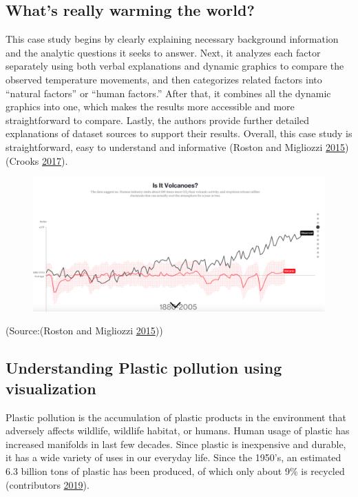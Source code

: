 \documentclass[]{book}
\begin{document}
\subsection{What's really warming the
world?}\label{whats-really-warming-the-world}

This case study begins by clearly explaining necessary background
information and the analytic questions it seeks to answer. Next, it
analyzes each factor separately using both verbal explanations and
dynamic graphics to compare the observed temperature movements, and then
categorizes related factors into ``natural factors'' or ``human
factors.'' After that, it combines all the dynamic graphics into one,
which makes the results more accessible and more straightforward to
compare. Lastly, the authors provide further detailed explanations of
dataset sources to support their results. Overall, this case study is
straightforward, easy to understand and informative (Roston and
Migliozzi \protect\hyperlink{ref-world_warming}{2015}) (Crooks
\protect\hyperlink{ref-int_viz_capt}{2017}).

\begin{figure}
\centering
\includegraphics{images/volcano_global_warming.png}
\caption{}
\end{figure}

(Source:(Roston and Migliozzi
\protect\hyperlink{ref-world_warming}{2015}))

\subsection{Understanding Plastic pollution using
visualization}\label{understanding-plastic-pollution-using-visualization}

Plastic pollution is the accumulation of plastic products in the
environment that adversely affects wildlife, wildlife habitat, or
humans. Human usage of plastic has increased manifolds in last few
decades. Since plastic is inexpensive and durable, it has a wide variety
of uses in our everyday life. Since the 1950's, an estimated 6.3 billion
tons of plastic has been produced, of which only about 9\% is recycled
(contributors \protect\hyperlink{ref-wiki_plastic_pollution}{2019}).
\end{document}

